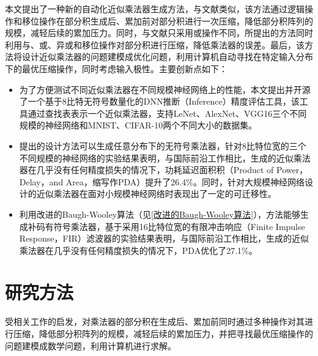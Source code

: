 本文提出了一种新的自动化近似乘法器生成方法，与文献\cite{AC:AM:SDLC}类似，该方法通过逻辑操作和移位操作在部分积生成后、累加前对部分积进行一次压缩，降低部分积阵列的规模，减轻后续的累加压力。同时，与文献\cite{AC:AM:SDLC}只采用或操作不同，所提出的方法同时利用与、或、异或和移位操作对部分积进行压缩，降低乘法器的误差。最后，该方法将设计近似乘法器的问题建模成优化问题，利用计算机自动寻找在特定输入分布下的最优压缩操作，同时考虑输入极性。主要创新点如下：
\begin{itemize}
    \item 为了方便测试不同近似乘法器在不同规模神经网络上的性能，本文提出并开源了一个基于8比特无符号数量化的DNN推断（Inference）精度评估工具，该工具通过查找表表示一个近似乘法器，支持LeNet\cite{DNN:LeNet_MNIST}、AlexNet\cite{DNN:AlexNet}、VGG16\cite{DNN:VGG16}三个不同规模的神经网络和MNIST\cite{DNN:LeNet_MNIST}、CIFAR-10\cite{DNN:CIFAR-10}两个不同大小的数据集。
    \item 提出的设计方法可以生成任意分布下的无符号乘法器，针对8比特位宽的三个不同规模的神经网络的实验结果表明，与国际前沿工作相比，生成的近似乘法器在几乎没有任何精度损失的情况下，功耗延迟面积积（Product of Power，Delay，and Area，缩写作PDA）提升了26.4\%。同时，针对大规模神经网络设计的近似乘法器在面对小规模神经网络时表现出了一定的可迁移性。
    \item 利用改进的Baugh-Wooley算法\cite{EM:baugh-wooley,EM:baugh-wooley_modified_PP_reorga,EM:baugh-wooley_diff}（见\ref{改进的Baugh-Wooley算法}），方法能够生成补码有符号乘法器，基于采用16比特位宽的有限冲击响应（Finite Impulse Response，FIR）滤波器的实验结果表明，与国际前沿工作相比，生成的近似乘法器在几乎没有任何精度损失的情况下，PDA优化了27.1\%。
\end{itemize}

\section{研究方法}

受相关工作\cite{AC:AM:SDLC,AC:AM:OU,AC:AM:CGP_2016}的启发，对乘法器的部分积在生成后、累加前同时通过多种操作对其进行压缩，降低部分积阵列的规模，减轻后续的累加压力，并把寻找最优压缩操作的问题建模成数学问题，利用计算机进行求解。

